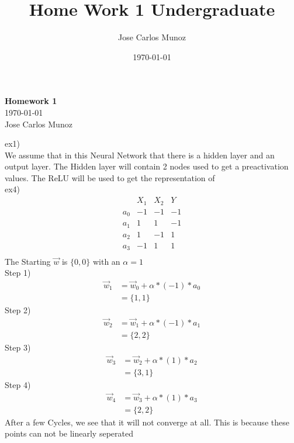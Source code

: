 \documentclass[12pt,english]{article}
\title{Home Work 1 Undergraduate}
\date{\today}
\author{Jose Carlos Munoz}
\begin{document}
\begin{center}
    \Large
    \textbf{Homework 1}\\
    \small
    \today\\
    \large
    Jose Carlos Munoz
\end{center}
ex1)\\
We assume that in this Neural Network that there is a hidden layer and an output layer. The Hidden layer will contain 2 nodes used to get a preactivation values. The ReLU will be used to get the representation of \\
ex4)\\
\begin{equation}
\begin{array}{c|cc|c}
 & X_1 &  X_2  & Y\\
\hline
a_0 &-1 & -1 & -1\\
\hline
a_1& 1 &  1  & -1\\
\hline
a_2 & 1 & -1 & 1\\
\hline
a_3& -1 & 1  & 1\\
\end{array}
\end{equation}
The Starting $\vec{w}$ is $\{0,0\}$ with an $\alpha = 1$\\
Step 1)
\begin{equation}\tag{1}
\begin{split}
\vec{w}_{1} &= \vec{w}_0+ \alpha * (-1) *a_0\\
&= \{1,1\}
\end{split}
\end{equation}
Step 2)
\begin{equation}\tag{1}
\begin{split}
\vec{w}_{2} &= \vec{w}_1+ \alpha * (-1) *a_1\\
&= \{2,2\}
\end{split}
\end{equation}
Step 3)\\
\begin{equation}\tag{3}
\begin{split}
\vec{w}_{3} &= \vec{w}_2+ \alpha * (1) *a_2\\
&= \{3,1\}
\end{split}
\end{equation}
Step 4)\\
\begin{equation}\tag{4}
\begin{split}
\vec{w}_{4} &= \vec{w}_3+ \alpha * (1) *a_3\\
&= \{2,2\}
\end{split}
\end{equation}
After a few Cycles, we see that it will not converge at all. This is because these points can not be linearly seperated
\end{document}

